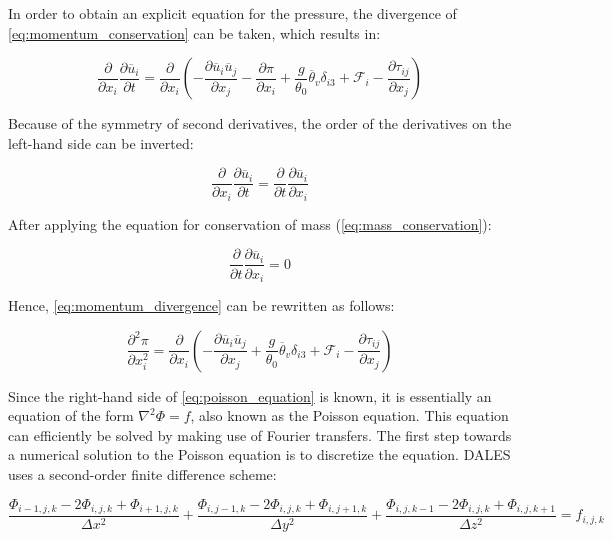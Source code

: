 In order to obtain an explicit equation for the pressure, the divergence of \autoref{eq:momentum_conservation} can be taken, which results in:

\begin{equation}
    \frac{\partial}{\partial x_i}\frac{\partial \overline{u}_i}{\partial t} = \frac{\partial}{\partial x_i} \left( - \frac{\partial \overline{u}_i \overline{u}_j}{\partial x_j} - \frac{\partial \pi}{\partial x_i} + \frac{g}{\theta_0}\overline{\theta}_v \delta_{i3} + \mathcal{F}_i - \frac{\partial \tau_{ij}}{\partial x_j} \right) \label{eq:momentum_divergence}
\end{equation}

\noindent Because of the symmetry of second derivatives, the order of the derivatives on the left-hand side can be inverted:

\begin{equation*}
    \frac{\partial}{\partial x_i}\frac{\partial \overline{u}_i}{\partial t} = \frac{\partial}{\partial t}\frac{\partial \overline{u}_i}{\partial x_i}
\end{equation*}

\noindent After applying the equation for conservation of mass (\autoref{eq:mass_conservation}):

\begin{equation}
    \frac{\partial}{\partial t} \frac{\partial \overline{u}_i}{\partial x_i} = 0
\end{equation}

\noindent Hence, \autoref{eq:momentum_divergence} can be rewritten as follows:

\begin{equation}
    \frac{\partial^2 \pi}{\partial x_i^2} = \frac{\partial}{\partial x_i} \left( - \frac{\partial \overline{u}_i \overline{u}_j}{\partial x_j} + \frac{g}{\theta_0}\overline{\theta}_v \delta_{i3} + \mathcal{F}_i - \frac{\partial \tau_{ij}}{\partial x_j} \right)
    \label{eq:poisson_equation}
\end{equation}

\noindent Since the right-hand side of \autoref{eq:poisson_equation} is known, it is essentially an equation of the form $\nabla^2 \Phi = f$, also known as the Poisson equation. This equation can efficiently be solved by making use of Fourier transfers. The first step towards a numerical solution to the Poisson equation is to discretize the equation. DALES uses a second-order finite difference scheme:

\begin{equation}
    \frac{\Phi_{i-1,j,k} - 2 \Phi_{i,j,k} + \Phi_{i+1,j,k}}{\Delta x^2} + \frac{\Phi_{i,j-1,k} - 2 \Phi_{i,j,k} + \Phi_{i,j+1,k}}{\Delta y^2} + \frac{\Phi_{i,j,k-1} - 2 \Phi_{i,j,k} + \Phi_{i,j,k+1}}{\Delta z^2} = f_{i,j,k}
    \label{eq:discretized_poisson_equation}
\end{equation}


